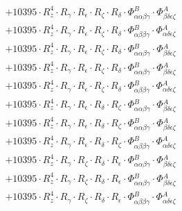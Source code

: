 \documentclass{article}
\begin{document}
\begin{subequations}
\begin{gather}
\begin{array}{c}
 \\[0.2em] 		 + 10395 \cdot R_{z}^{4} \cdot R_{\gamma{}} \cdot R_{\epsilon{}} \cdot R_{\zeta{}} \cdot R_{\delta{}} \cdot \Phi{}^{B}_{\alpha{}\alpha{}\beta{}\gamma{}} \cdot \Phi{}^{A}_{\beta{}\delta{}\epsilon{}\zeta{}} 
 \\[0.2em] 		 + 10395 \cdot R_{z}^{4} \cdot R_{\gamma{}} \cdot R_{\epsilon{}} \cdot R_{\zeta{}} \cdot R_{\delta{}} \cdot \Phi{}^{B}_{\alpha{}\beta{}\beta{}\gamma{}} \cdot \Phi{}^{A}_{\alpha{}\delta{}\epsilon{}\zeta{}} 
 \\[0.2em] 		 + 10395 \cdot R_{z}^{4} \cdot R_{\gamma{}} \cdot R_{\epsilon{}} \cdot R_{\zeta{}} \cdot R_{\delta{}} \cdot \Phi{}^{B}_{\alpha{}\alpha{}\beta{}\gamma{}} \cdot \Phi{}^{A}_{\beta{}\delta{}\epsilon{}\zeta{}} 
 \\[0.2em] 		 + 10395 \cdot R_{z}^{4} \cdot R_{\gamma{}} \cdot R_{\epsilon{}} \cdot R_{\zeta{}} \cdot R_{\delta{}} \cdot \Phi{}^{B}_{\alpha{}\alpha{}\beta{}\gamma{}} \cdot \Phi{}^{A}_{\beta{}\delta{}\epsilon{}\zeta{}} 
 \\[0.2em] 		 + 10395 \cdot R_{z}^{4} \cdot R_{\gamma{}} \cdot R_{\epsilon{}} \cdot R_{\zeta{}} \cdot R_{\delta{}} \cdot \Phi{}^{B}_{\alpha{}\beta{}\beta{}\gamma{}} \cdot \Phi{}^{A}_{\alpha{}\delta{}\epsilon{}\zeta{}} 
 \\[0.2em] 		 + 10395 \cdot R_{z}^{4} \cdot R_{\gamma{}} \cdot R_{\epsilon{}} \cdot R_{\delta{}} \cdot R_{\zeta{}} \cdot \Phi{}^{B}_{\alpha{}\alpha{}\beta{}\gamma{}} \cdot \Phi{}^{A}_{\beta{}\delta{}\epsilon{}\zeta{}} 
 \\[0.2em] 		 + 10395 \cdot R_{z}^{4} \cdot R_{\gamma{}} \cdot R_{\epsilon{}} \cdot R_{\delta{}} \cdot R_{\zeta{}} \cdot \Phi{}^{B}_{\alpha{}\alpha{}\beta{}\gamma{}} \cdot \Phi{}^{A}_{\beta{}\delta{}\epsilon{}\zeta{}} 
 \\[0.2em] 		 + 10395 \cdot R_{z}^{4} \cdot R_{\gamma{}} \cdot R_{\epsilon{}} \cdot R_{\delta{}} \cdot R_{\zeta{}} \cdot \Phi{}^{B}_{\alpha{}\beta{}\beta{}\gamma{}} \cdot \Phi{}^{A}_{\alpha{}\delta{}\epsilon{}\zeta{}} 
 \\[0.2em] 		 + 10395 \cdot R_{z}^{4} \cdot R_{\gamma{}} \cdot R_{\zeta{}} \cdot R_{\delta{}} \cdot R_{\epsilon{}} \cdot \Phi{}^{B}_{\alpha{}\alpha{}\beta{}\gamma{}} \cdot \Phi{}^{A}_{\beta{}\delta{}\epsilon{}\zeta{}} 
 \\[0.2em] 		 + 10395 \cdot R_{z}^{4} \cdot R_{\gamma{}} \cdot R_{\zeta{}} \cdot R_{\delta{}} \cdot R_{\epsilon{}} \cdot \Phi{}^{B}_{\alpha{}\alpha{}\beta{}\gamma{}} \cdot \Phi{}^{A}_{\beta{}\delta{}\epsilon{}\zeta{}} 
 \\[0.2em] 		 + 10395 \cdot R_{z}^{4} \cdot R_{\gamma{}} \cdot R_{\zeta{}} \cdot R_{\delta{}} \cdot R_{\epsilon{}} \cdot \Phi{}^{B}_{\alpha{}\beta{}\beta{}\gamma{}} \cdot \Phi{}^{A}_{\alpha{}\delta{}\epsilon{}\zeta{}} 

\end{array}
\end{gather}
\end{subequations}
\end{document}
